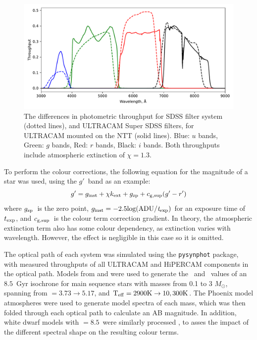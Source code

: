 \begin{figure}
    \centering
    \includegraphics[width=\columnwidth]{figures/three_cvs_with_weird_colours/GeneralFigs/bandpass_diffs_SDSS_dots_UCAMNTT_solid.pdf}
    \caption{The differences in photometric throughput for SDSS filter system (dotted lines), and ULTRACAM Super SDSS filters, for ULTRACAM mounted on the NTT (solid lines). Blue: $u$ bands, Green: $g$ bands, Red: $r$ bands, Black: $i$ bands. Both throughputs include atmospheric extinction of $\chi = 1.3$.}
    \label{fig:sdss vs super filters}
\end{figure}


To perform the colour corrections, the following equation for the magnitude of a star was used, using the $g'$\ band as an example:
\begin{equation}
    \label{eqn:gen magnitudes}
    g' = g_{\rm inst} + \chi k_{\rm ext} + g_{\rm zp} + c_{\rm g, sup}(g'-r') 
\end{equation}
where $g_{\rm zp}$\ is the zero point, $g_{\rm inst} = -2.5 \rm log(ADU/{\it t}_{\rm exp})$
for an exposure time of $t_{\rm exp}$, and $c_{\rm g, sup}$\ is the colour term correction gradient. In theory, the atmospheric extinction term also has some colour dependency, as extinction varies with wavelength. However, the effect is negligible in this case so it is omitted.

The optical path of each system was simulated using the \texttt{pysynphot} package, with measured throughputs of all ULTRACAM and HiPERCAM components in the optical path. Models from \citet{Dotter2016} and \citet{Choi2016} were used to generate the \teff\ and \logg\ values of an $8.5$\ Gyr isochrone for main sequence stars with masses from 0.1 to 3 $M_\odot$, spanning from \logg $= 3.73 \to 5.17$, and $\rm{T_{eff}} = 2900K \to 10,300K$. The Phoenix model atmospheres \citep{allard2012} were used to generate model spectra of each mass, which was then folded through each optical path to calculate an AB magnitude. In addition, white dwarf models with \logg$=8.5$\ were similarly processed \citep{koester2010, tremblay2009}, to asses the impact of the different spectral shape on the resulting colour terms.


